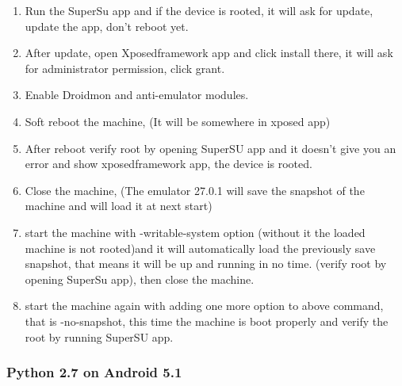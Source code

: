 \documentclass[../main.tex]{subfile}
\begin{document}
\begin{enumerate}
		\item Run the SuperSu app and if the device is rooted, it will ask for update, update the app, don't reboot yet.
		\item After update, open Xposedframework app and click install there, it will ask for administrator permission, click grant.
		\item Enable Droidmon and anti-emulator modules.
		\item Soft reboot the machine, (It will be somewhere in xposed app)
		\item After reboot verify root by opening SuperSU app and it doesn't give you an error and show xposedframework app, the device is rooted.
		\item Close the machine, (The emulator 27.0.1 will save the snapshot of the machine and will load it at next start)
		\item start the machine with -writable-system option (without it the loaded machine is not rooted)and it will automatically load the previously save snapshot, that means it will be up and running in no time. (verify root by opening SuperSu app), then close the machine.
		\item start the machine again with adding one more option to above command, that is -no-snapshot, this time the machine is boot properly and verify the root by running SuperSU app.
					
		\end{enumerate}
		\subsubsection{Python 2.7 on Android 5.1} \label{sec:android_5.1_python}
\end{document}
